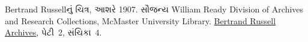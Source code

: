 Bertrand Russellનું ચિત્ર, આશરે 1907. સૌજન્ય William Ready Division of
Archives and Research Collections, McMaster University Library.
\href{http://www.mcmaster.ca/russdocs/russell.htm}{Bertrand Russell Archives},
પેટી~2, સંચિકા~4.

